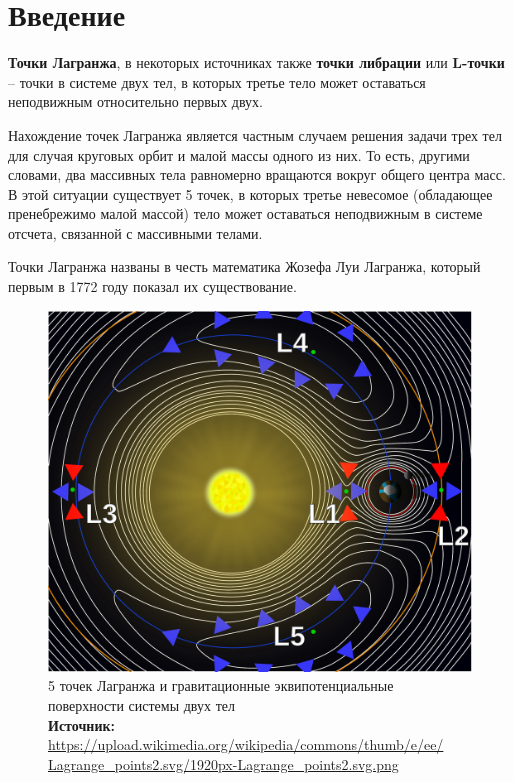 \documentclass[12pt]{article}
\begin{document}
    \newpage

    \section{Введение}
    \par \textbf{Точки Лагранжа}, в некоторых источниках также \textbf{точки
    либрации} или \textbf{L-точки} -- точки в системе двух тел, в которых
    третье тело может оставаться неподвижным относительно первых двух.
    \par Нахождение точек Лагранжа является частным случаем решения задачи
    трех тел для случая круговых орбит и малой массы одного из них. То есть,
    другими словами, два массивных тела равномерно вращаются вокруг общего
    центра масс. В этой ситуации существует 5 точек, в которых третье
    невесомое (обладающее пренебрежимо малой массой) тело может оставаться
    неподвижным в системе отсчета, связанной с массивными телами.
    \par Точки Лагранжа названы в честь математика Жозефа Луи Лагранжа,
    который первым в 1772 году показал их существование.
    \begin{figure}[H]
        \centering
        \includegraphics[scale=0.35]{Lagrange_points.pdf}
        \caption{5 точек Лагранжа и гравитационные эквипотенциальные
        поверхности системы двух тел\\
        \textbf{Источник:}
        \url{https://upload.wikimedia.org/wikipedia/commons/thumb/e/ee/
        Lagrange_points2.svg/1920px-Lagrange_points2.svg.png}}
    \end{figure}
\end{document}
